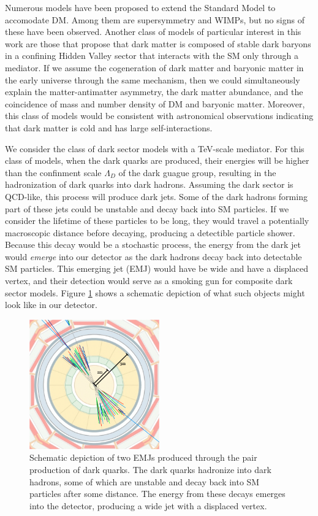 Numerous models have been proposed to extend the Standard Model to accomodate DM. Among them are supersymmetry and WIMPs, but no signs of these have been observed. Another class of models of particular interest in this work are those that propose that dark matter is composed of stable dark baryons in a confining Hidden Valley sector that interacts with the SM only through a mediator. If we assume the cogeneration of dark matter and baryonic matter in the early universe through the same mechanism, then we could simultaneously explain the matter-antimatter asymmetry, the dark matter abundance, and the coincidence of mass and number density of DM and baryonic matter. Moreover, this class of models would be consistent with astronomical observations indicating that dark matter is cold and has large self-interactions.

We consider the class of dark sector models with a TeV-scale mediator. For this class of models, when the dark quarks are produced, their energies will be higher than the confinment scale $\Lambda_D$ of the dark guague group, resulting in the hadronization of dark quarks into dark hadrons. Assuming the dark sector is QCD-like, this process will produce dark jets. Some of the dark hadrons forming part of these jets could be unstable and decay back into SM particles. If we consider the lifetime of these particles to be long, they would travel a potentially macroscopic distance before decaying, producing a detectible particle shower. Because this decay would be a stochastic process, the energy from the dark jet would \textit{emerge} into our detector as the dark hadrons decay back into detectable SM particles. This emerging jet (EMJ) would have be wide and have a displaced vertex, and their detection would serve as a smoking gun for composite dark sector models. Figure \ref{fig:emj} shows a schematic depiction of what such objects might look like in our detector.

\begin{figure}[ht]
	\centering
	\includegraphics[width=0.5\textwidth]{images/emj.png}
	\caption{Schematic depiction of two EMJs produced through the pair production of dark quarks. The dark quarks hadronize into dark hadrons, some of which are unstable and decay back into SM particles after some distance. The energy from these decays emerges into the detector, producing a wide jet with a displaced vertex.}
	\label{fig:emj}
\end{figure}

